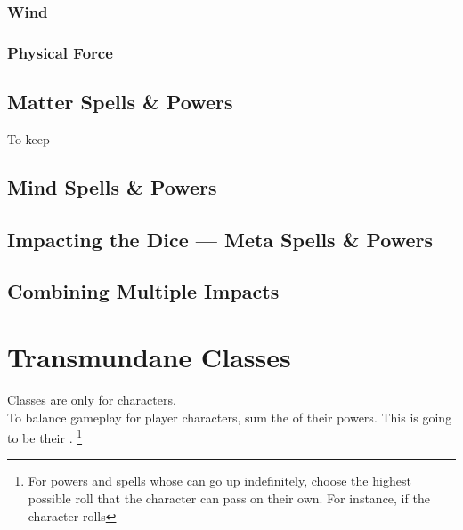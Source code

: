 \documentclass{LegrandOrangeTufteBook}
\begin{document}
\subsubsection*{Wind}

\subsubsection*{Physical Force}

\subsection*{Matter Spells \& Powers}

To keep

\subsection*{Mind Spells \& Powers}

\subsection*{Impacting the Dice --- Meta Spells \& Powers}

\subsection*{Combining Multiple Impacts}



\section*{Transmundane Classes}

Classes are only for  characters.\\

To balance gameplay for  player characters,
sum the  of their  powers.
This is going to be their .
\footnote{
    For powers and spells whose  can go up indefinitely, choose the highest possible roll that the character can pass on their own.
    For instance, if the character rolls 
}
\\
\end{document}
